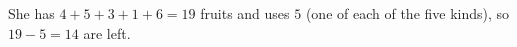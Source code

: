 She has $4+5+3+1+6=19$ fruits and uses $5$ (one of each of the five kinds), so $19-5=\boxed{14}$ are left.
